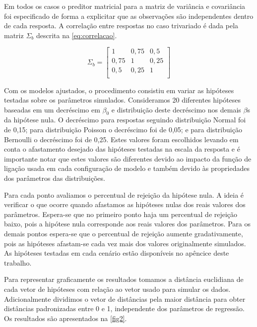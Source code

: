 \documentclass[AMA,STIX1COL]{WileyNJD-v2}
\begin{document}
Em todos os casos o preditor matricial para a matriz de variância e covariância foi especificado de forma a explicitar que as observações são independentes dentro de cada resposta. A correlação entre respostas no caso trivariado é dada pela matriz $\Sigma_b$ descrita na \autoref{eq:correlacao}.

\begin{equation} \label{eq:correlacao}
\Sigma_b = 
\begin{bmatrix}
1    & 0,75 & 0,5  \\
0,75 & 1    & 0,25 \\
0,5  & 0,25 & 1    \\
\end{bmatrix}
\end{equation}

Com os modelos ajustados, o procedimento consistiu em variar as hipóteses testadas sobre os parâmetros simulados. Consideramos 20 diferentes hipóteses baseadas em um decréscimo em $\beta_0$ e distribuição deste decréscimo nos demais $\beta$s da hipótese nula. O decréscimo para respostas seguindo distribuição Normal foi de 0,15; para distribuição Poisson o decréscimo foi de 0,05; e para distribuição Bernoulli o decréscimo foi de 0,25. Estes valores foram escolhidos levando em conta o afastamento desejado das hipóteses testadas na escala da resposta e é importante notar que estes valores são diferentes devido ao impacto da função de ligação usada em cada configuração de modelo e também devido às propriedades dos parâmetros das distribuições.

Para cada ponto avaliamos o percentual de rejeição da hipótese nula. A ideia é verificar o que ocorre quando afastamos as hipóteses nulas dos reais valores dos parâmetros. Espera-se que no primeiro ponto haja um percentual de rejeição baixo, pois a hipótese nula corresponde aos reais valores dos parâmetros. Para os demais pontos espera-se que o percentual de rejeição aumente gradativamente, pois as hipóteses afastam-se cada vez mais dos valores originalmente simulados. As hipóteses testadas em cada cenário estão disponíveis no apêncice deste trabalho.
 
Para representar graficamente os resultados tomamos a distância euclidiana de cada vetor de hipóteses com relação ao vetor usado para simular os dados. Adicionalmente dividimos o vetor de distâncias pela maior distância para obter distâncias padronizadas entre 0 e 1, independente dos parâmetros de regressão. Os resultados são apresentados na \autoref{fig2}.
\end{document}
